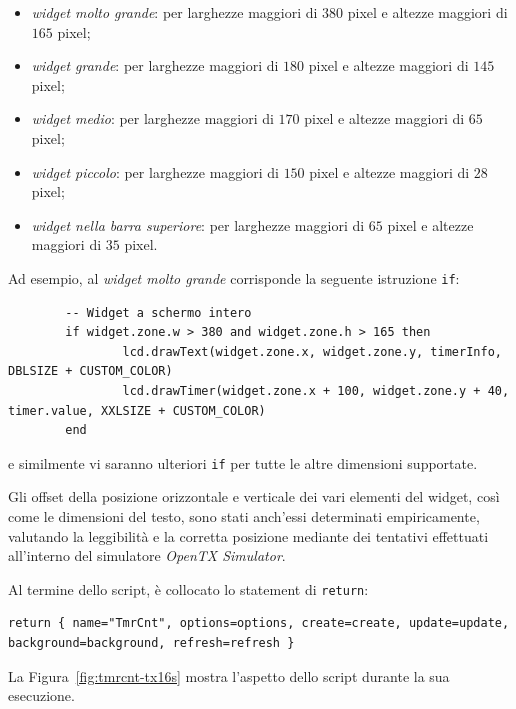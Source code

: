 \documentclass[a4paper, 12pt]{report} %
\begin{document}
\begin{itemize}
        \item \emph{widget molto grande}: per larghezze maggiori di $380$ pixel e altezze maggiori di $165$ pixel;
        \item \emph{widget grande}: per larghezze maggiori di $180$ pixel e altezze maggiori di $145$ pixel;
        \item \emph{widget medio}: per larghezze maggiori di $170$ pixel e altezze maggiori di $65$ pixel;
        \item \emph{widget piccolo}: per larghezze maggiori di $150$ pixel e altezze maggiori di $28$ pixel;
        \item \emph{widget nella barra superiore}: per larghezze maggiori di $65$ pixel e altezze maggiori di $35$ pixel.
\end{itemize}

Ad esempio, al \emph{widget molto grande} corrisponde la seguente istruzione \texttt{if}:

\begin{lstlisting}
        -- Widget a schermo intero
        if widget.zone.w > 380 and widget.zone.h > 165 then
                lcd.drawText(widget.zone.x, widget.zone.y, timerInfo, DBLSIZE + CUSTOM_COLOR)
                lcd.drawTimer(widget.zone.x + 100, widget.zone.y + 40, timer.value, XXLSIZE + CUSTOM_COLOR)
        end
\end{lstlisting}

e similmente vi saranno ulteriori \texttt{if} per tutte le altre dimensioni supportate.

Gli offset della posizione orizzontale e verticale dei vari elementi del widget, così come le dimensioni del testo, sono stati anch'essi determinati empiricamente, valutando la leggibilità e la corretta posizione mediante dei tentativi effettuati all'interno del simulatore \emph{OpenTX Simulator}.

Al termine dello script, è collocato lo statement di \texttt{return}:

\begin{lstlisting}
return { name="TmrCnt", options=options, create=create, update=update, background=background, refresh=refresh }
\end{lstlisting}

La Figura~\ref{fig:tmrcnt-tx16s} mostra l'aspetto dello script durante la sua esecuzione.
\end{document}
